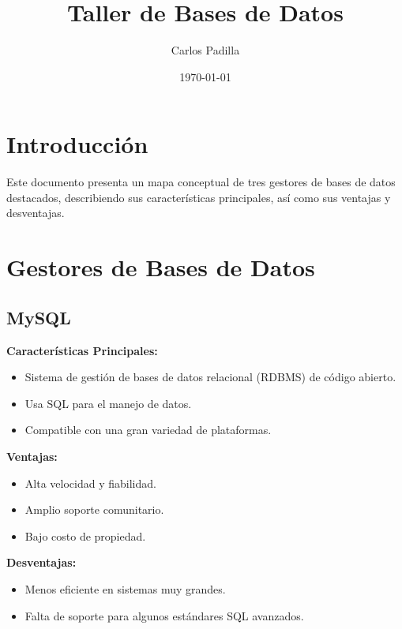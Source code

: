 \documentclass{article}
\title{Taller de Bases de Datos}
\author{Carlos Padilla}
\date{\today}
\begin{document}
\maketitle

\section{Introducción}
Este documento presenta un mapa conceptual de tres gestores de bases de datos destacados, describiendo sus características principales, así como sus ventajas y desventajas.

\section{Gestores de Bases de Datos}
\subsection{MySQL}
\textbf{Características Principales:}
\begin{itemize}
    \item Sistema de gestión de bases de datos relacional (RDBMS) de código abierto.
    \item Usa SQL para el manejo de datos.
    \item Compatible con una gran variedad de plataformas.
\end{itemize}
\textbf{Ventajas:}
\begin{itemize}
    \item Alta velocidad y fiabilidad.
    \item Amplio soporte comunitario.
    \item Bajo costo de propiedad.
\end{itemize}
\textbf{Desventajas:}
\begin{itemize}
    \item Menos eficiente en sistemas muy grandes.
    \item Falta de soporte para algunos estándares SQL avanzados.
\end{itemize}
\end{document}
